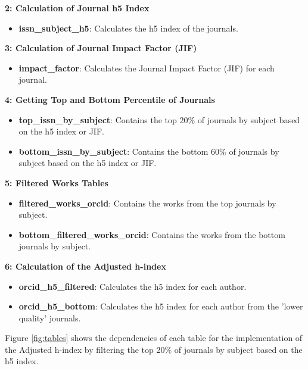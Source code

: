 \noindent\textbf{2: Calculation of Journal h5 Index}
\begin{itemize}
      \item \textbf{issn\_subject\_h5}: Calculates the h5 index of the journals.
\end{itemize}

\noindent\textbf{3: Calculation of Journal Impact Factor (JIF)}
\begin{itemize}
      \item \textbf{impact\_factor}: Calculates the Journal Impact Factor (JIF) for each journal.
\end{itemize}

\noindent\textbf{4: Getting Top and Bottom Percentile of Journals}
\begin{itemize}
      \item \textbf{top\_issn\_by\_subject}: Contains the top 20\% of journals by subject based on the h5 index or JIF.
      \item \textbf{bottom\_issn\_by\_subject}: Contains the bottom 60\% of journals by subject based on the h5 index or JIF.
\end{itemize}

\noindent\textbf{5: Filtered Works Tables}
\begin{itemize}
      \item \textbf{filtered\_works\_orcid}: Contains the works from the top journals by subject.
      \item \textbf{bottom\_filtered\_works\_orcid}: Contains the works from the bottom journals by subject.
\end{itemize}

\noindent\textbf{6: Calculation of the Adjusted h-index}
\begin{itemize}
      \item \textbf{orcid\_h5\_filtered}: Calculates the h5 index for each author.
      \item \textbf{orcid\_h5\_bottom}: Calculates the h5 index for each author from the 'lower quality' journals.
\end{itemize}

Figure \ref{fig:tables} shows the dependencies of each table for the
implementation of the Adjusted h-index by filtering the top 20\% of journals by
subject based on the h5 index.


